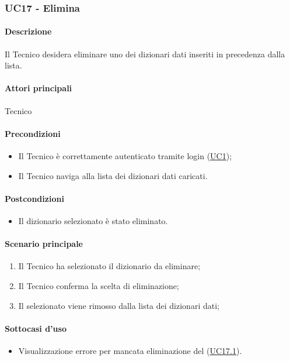 \subsubsection{UC17 - Elimina }\label{UC17}
\paragraph*{Descrizione}
Il Tecnico desidera eliminare uno dei dizionari dati inseriti in precedenza dalla lista.

\paragraph*{Attori principali}
Tecnico

\paragraph*{Precondizioni}
\begin{itemize}
  \item Il Tecnico è correttamente autenticato tramite login (\hyperref[UC1]{UC1});
  \item Il Tecnico naviga alla lista dei dizionari dati caricati.  
\end{itemize}

\paragraph*{Postcondizioni}
\begin{itemize}
  \item Il dizionario selezionato è stato eliminato.
\end{itemize}

\paragraph*{Scenario principale}
\begin{enumerate}
  \item Il Tecnico ha selezionato il dizionario da eliminare;
  \item Il Tecnico conferma la scelta di eliminazione;
  \item Il  selezionato viene rimosso dalla lista dei dizionari dati;  
\end{enumerate}

\paragraph*{Sottocasi d'uso}
\begin{itemize}
  \item Visualizzazione errore per mancata eliminazione del  (\hyperref[UC17point1]{UC17.1}).
\end{itemize}

